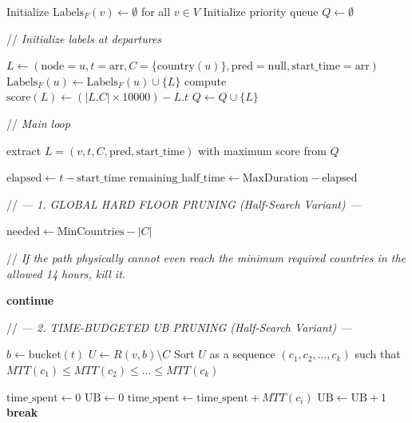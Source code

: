 \documentclass{article}
\newcommand{\CommentLine}[1]{
    \State // \textit{#1}
}
\begin{document}
\begin{algorithmic}[1]
    \State Initialize $\text{Labels}_F(v) \leftarrow \emptyset$ for all $v \in V$
    \State Initialize priority queue $Q \leftarrow \emptyset$ 

    \vspace{0.5em}
    \CommentLine{Initialize labels at departures}
            \State $L \leftarrow (\text{node}=u, t=\text{arr}, C=\{\text{country}(u)\}, \text{pred}=\text{null}, \text{start\_time}=\text{arr})$
            \State $\text{Labels}_F(u) \leftarrow \text{Labels}_F(u) \cup \{L\}$
            \State compute $\text{score}(L) \leftarrow (|L.C| \times 10000) - L.t$
            \State $Q \leftarrow Q \cup \{L\}$
        \EndFor
    \EndFor

    \vspace{0.5em}
    \CommentLine{Main loop}
        \State extract $L=(v,t,C,\text{pred},\text{start\_time})$ with maximum score from $Q$

        \State $\text{elapsed} \leftarrow t - \text{start\_time}$
        \State $\text{remaining\_half\_time} \leftarrow \text{MaxDuration} - \text{elapsed}$

        \vspace{0.5em}
        \CommentLine{--- 1. GLOBAL HARD FLOOR PRUNING (Half-Search Variant) ---}
        \State $\text{needed} \leftarrow \text{MinCountries} - |C|$
        \CommentLine{If the path physically cannot even reach the minimum required countries in the allowed 14 hours, kill it.}
            \State \textbf{continue}
        \EndIf

        \vspace{0.5em}
        \CommentLine{--- 2. TIME-BUDGETED UB PRUNING (Half-Search Variant) ---}
            \State $b \leftarrow \text{bucket}(t)$
            \State $U \leftarrow R(v,b) \setminus C$
            \State Sort $U$ as a sequence $(c_1, c_2, \ldots, c_k)$ such that $MTT(c_1) \le MTT(c_2) \le \ldots \le MTT(c_k)$

            \State $\text{time\_spent} \leftarrow 0$
            \State $\text{UB} \leftarrow 0$
                \State $\text{time\_spent} \leftarrow \text{time\_spent} + MTT(c_i)$
                    \State $\text{UB} \leftarrow \text{UB} + 1$
                \Else
                    \State \textbf{break}
                \EndIf
            \EndFor


\end{algorithmic}
\end{document}
